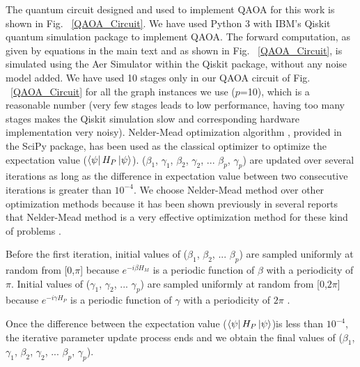 \documentclass[10pt]{article}
\begin{document}
The quantum circuit designed and used to implement QAOA for this work is shown in Fig. ~\ref{QAOA_Circuit}. We have used Python 3 with IBM's Qiskit quantum simulation package \cite{Qiskit} to implement QAOA. The forward computation, as given by equations in the main text and as shown in Fig. ~\ref{QAOA_Circuit}, is simulated using the Aer Simulator within the Qiskit package, without any noise model added. We have used 10 stages only in our QAOA circuit of Fig. ~\ref{QAOA_Circuit} for all the graph instances we use ($p$=10), which is a reasonable number (very few stages leads to low performance, having too many stages makes the Qiskit simulation slow and corresponding hardware implementation very noisy). Nelder-Mead optimization algorithm \cite{NelderMead}, provided in the SciPy package, has been used as the classical optimizer to optimize the expectation value ($\bra{\psi}H_P\ket{\psi}$). ($\beta_1$, $\gamma_1$, $\beta_2$, $\gamma_2$, ... $\beta_p$, $\gamma_p$) are updated over several iterations as long as the difference in expectation value between two consecutive iterations is greater than $10^{-4}$. We choose Nelder-Mead method over other optimization methods because it has been shown previously in several reports that Nelder-Mead method \cite{NelderMead} is a very effective optimization method for these kind of problems \cite{QAOA_ErdosRenyi,QuantumAnnealingvsQAOA1,QAOA_NelderMead1,QAOA_NelderMead2}. 


Before the first iteration, initial values of ($\beta_1$, $\beta_2$, ... $\beta_p$) are sampled uniformly at random from [0,$\pi$] because $e^{-i\beta H_M}$ is a periodic function of $\beta$ with a periodicity of $\pi$. Initial values of ($\gamma_1$, $\gamma_2$, ... $\gamma_p$) are sampled uniformly at random from [0,$2\pi$] because $e^{-i\gamma H_P}$ is a periodic function of $\gamma$ with a periodicity of $2\pi$ \cite{QAOA_Farhi,QAOA_ErdosRenyi,QAOA_CompleteGraph,QAOA_NelderMead1,QAOA_NelderMead2}. 

Once the difference between the expectation value ($\bra{\psi}H_P\ket{\psi}$)is less than $10^{-4}$, the iterative parameter update process ends and we obtain the final values of ($\beta_1$, $\gamma_1$, $\beta_2$, $\gamma_2$, ... $\beta_p$, $\gamma_p$). 
\end{document}

